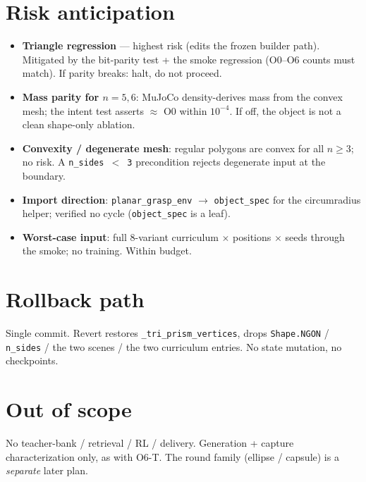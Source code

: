 \documentclass[11pt]{article}
\begin{document}
\section{Risk anticipation}
\begin{itemize}[nosep]
  \item \textbf{Triangle regression} --- highest risk (edits the frozen builder path). Mitigated by the
    bit-parity test + the smoke regression (O0--O6 counts must match). If parity breaks: halt, do not
    proceed.
  \item \textbf{Mass parity for $n=5,6$}: MuJoCo density-derives mass from the convex mesh; the intent
    test asserts $\approx$ O0 within $10^{-4}$. If off, the object is not a clean shape-only ablation.
  \item \textbf{Convexity / degenerate mesh}: regular polygons are convex for all $n\ge3$; no risk.
    A \texttt{n\_sides $<$ 3} precondition rejects degenerate input at the boundary.
  \item \textbf{Import direction}: \texttt{planar\_grasp\_env} $\to$ \texttt{object\_spec} for the
    circumradius helper; verified no cycle (\texttt{object\_spec} is a leaf).
  \item \textbf{Worst-case input}: full 8-variant curriculum $\times$ positions $\times$ seeds through
    the smoke; no training. Within budget.
\end{itemize}

\section{Rollback path}
Single commit. Revert restores \texttt{\_tri\_prism\_vertices}, drops \texttt{Shape.NGON} /
\texttt{n\_sides} / the two scenes / the two curriculum entries. No state mutation, no checkpoints.

\section{Out of scope}
No teacher-bank / retrieval / RL / delivery. Generation + capture characterization only, as with O6-T.
The round family (ellipse / capsule) is a \emph{separate} later plan.
\end{document}
